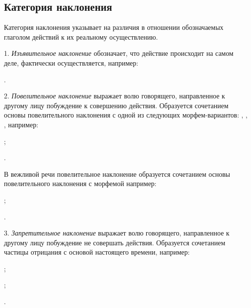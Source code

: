 \subsection{Категория наклонения}

Категория наклонения указывает на различия в отношении обозначаемых глаголом действий к их реальному осуществлению.

1. \emph{Изъявительное наклонение} обозначает, что действие происходит на самом деле, фактически осуществляется, например:
\begin{prfsample}
	\item {}.
\end{prfsample}

2. \emph{Повелительное наклонение} выражает волю говорящего, направленное к другому лицу побуждение к совершению действия. Образуется сочетанием основы повелительного наклонения с одной из следующих морфем-вариантов: , , , например:
\begin{prfsample}
	\item {};
	\item {}.
\end{prfsample}

В вежливой речи повелительное наклонение образуется сочетанием основы повелительного наклонения с морфемой  например:
\begin{prfsample}
	\item {};
	\item {}.
\end{prfsample}

3. \emph{Запретительное наклонение} выражает волю говорящего, направленное к другому лицу побуждение не совершать действия. Образуется сочетанием частицы отрицания с основой настоящего времени, например:
\begin{prfsample}
	\item {};
	\item {};
	\item {}.
\end{prfsample}

